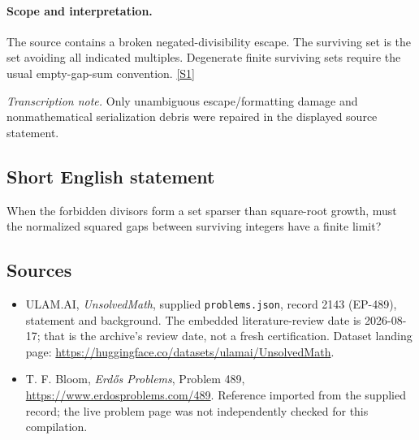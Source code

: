 \documentclass[11pt,a4paper]{article}
\newcommand{\sref}[2]{\hyperlink{source:#1:#2}{[S#2]}}
\begin{document}
\paragraph{Scope and interpretation.}

The source contains a broken negated-divisibility escape. The surviving set is the set avoiding all indicated multiples. Degenerate finite surviving sets require the usual empty-gap-sum convention. \sref{2143}{1}

{\small\emph{Transcription note.} Only unambiguous escape/formatting damage and nonmathematical serialization debris were repaired in the displayed source statement.}

\subsection{Short English statement}

When the forbidden divisors form a set sparser than square-root growth, must the normalized squared gaps between surviving integers have a finite limit?

\subsection{Sources}

{\small

\begin{itemize}

\item[\hypertarget{source:2143:1}{S1}] ULAM.AI, \emph{UnsolvedMath}, supplied \texttt{problems.json}, record 2143 (EP-489), statement and background. The embedded literature-review date is 2026-08-17; that is the archive’s review date, not a fresh certification. Dataset landing page: \url{https://huggingface.co/datasets/ulamai/UnsolvedMath}.

\item[\hypertarget{source:2143:2}{S2}] T. F. Bloom, \emph{Erdős Problems}, Problem 489, \url{https://www.erdosproblems.com/489}. Reference imported from the supplied record; the live problem page was not independently checked for this compilation.

\end{itemize}

}

\label{end:2143}
\end{document}
